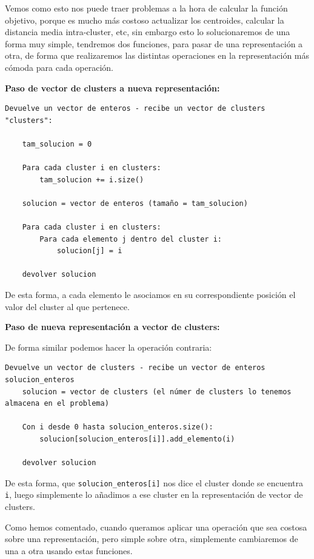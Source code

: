 \documentclass[12pt, spanish]{article}
\begin{document}
Vemos como esto nos puede traer problemas a la hora de calcular la función objetivo, porque es mucho más costoso actualizar los centroides, calcular la distancia media intra-cluster, etc, sin embargo esto lo solucionaremos de una forma muy simple, tendremos dos funciones, para pasar de una representación a otra, de forma que realizaremos las distintas operaciones en la representación más cómoda para cada operación.

\newpage

\textbf{Paso de vector de clusters a nueva representación:}

\begin{lstlisting}
Devuelve un vector de enteros - recibe un vector de clusters "clusters":
	
	tam_solucion = 0
	
	Para cada cluster i en clusters:
		tam_solucion += i.size()
		
	solucion = vector de enteros (tamaño = tam_solucion)
	
	Para cada cluster i en clusters:
		Para cada elemento j dentro del cluster i:
			solucion[j] = i
			
	devolver solucion
\end{lstlisting}

De esta forma, a cada elemento le asociamos en su correspondiente posición el valor del cluster al que pertenece.

\textbf{Paso de nueva representación a vector de clusters:}

De forma similar podemos hacer la operación contraria:

\begin{lstlisting}
Devuelve un vector de clusters - recibe un vector de enteros solucion_enteros
	solucion = vector de clusters (el númer de clusters lo tenemos almacena en el problema)
	
	Con i desde 0 hasta solucion_enteros.size():
		solucion[solucion_enteros[i]].add_elemento(i)
	
	devolver solucion
\end{lstlisting}

De esta forma, que \texttt{solucion\_enteros[i]} nos dice el cluster donde se encuentra \texttt{i}, luego simplemente lo añadimos a ese cluster en la representación de vector de clusters.



Como hemos comentado, cuando queramos aplicar una operación que sea costosa sobre una representación, pero simple sobre otra, simplemente cambiaremos de una a otra usando estas funciones.
\end{document}
